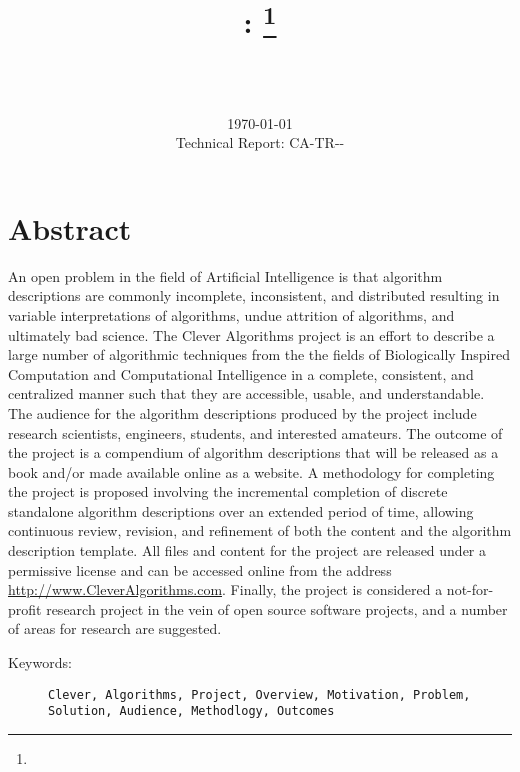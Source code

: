 \documentclass[a4paper, 11pt]{article}
\title{{\myreporttitle}: {\myreportsubtitle}\footnote{\myreportlicense}}
\author{\myreportauthor\\{\myreportemail}\\\small\myreportproject}
\date{\today\\{\small{Technical Report: CA-TR-{\myreportdate}-\myreportversion}}}
\begin{document}
\maketitle

\section*{Abstract} 
An open problem in the field of Artificial Intelligence is that algorithm descriptions are commonly incomplete, inconsistent, and distributed resulting in variable interpretations of algorithms, undue attrition of algorithms, and ultimately bad science. 
The Clever Algorithms project is an effort to describe a large number of algorithmic techniques from the the fields of Biologically Inspired Computation and Computational Intelligence in a complete, consistent, and centralized manner such that they are accessible, usable, and understandable. 
The audience for the algorithm descriptions produced by the project include research scientists, engineers, students, and interested amateurs.
The outcome of the project is a compendium of algorithm descriptions that will be released as a book and/or made available online as a website.
A methodology for completing the project is proposed involving the incremental completion of discrete standalone algorithm descriptions over an extended period of time, allowing continuous review, revision, and refinement of both the content and the algorithm description template.
All files and content for the project are released under a permissive license and can be accessed online from the address \url{http://www.CleverAlgorithms.com}.
Finally, the project is considered a not-for-profit research project in the vein of open source software projects, and a number of areas for research are suggested. 

\begin{description}
	\item[Keywords:] {\small\texttt{Clever, Algorithms, Project, Overview, Motivation, Problem, Solution, Audience, Methodlogy, Outcomes}}
\end{description} 

\end{document}
